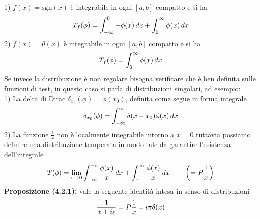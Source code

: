 \documentclass{article}
\begin{document}
1) $f(x) = \mathrm{sgn}(x)$ è integrabile in ogni $[a, b]$ compatto e si ha
\begin{gather}
    T_f(\phi) = \int_{-\infty}^0 -\phi(x) \, dx + \int_0^{\infty} \phi(x) \, dx \notag
\end{gather}
2) $f(x) = \theta(x)$ è integrabile in ogni $[a, b]$ compatto e si ha
\begin{gather}
    T_f(\phi) = \int_0^\infty \phi(x) \, dx \notag
\end{gather}
Se invece la distribuzione è non regolare bisogna verificare che è ben definita sulle funzioni di test, in questo caso si parla di distribuzioni singolari, ad esempio: \\
1) La delta di Dirac $\delta_{x_0}(\phi) = \phi(x_0)$, definita come segue in forma integrale
\begin{gather}
    \delta_{x_0}(\phi) = \int_{-\infty}^\infty \delta(x - x_0)\phi(x) \, dx \notag
\end{gather}
2) La funzione $\frac{1}{x}$ non è localmente integrabile intorno a $x = 0$ tuttavia possiamo definire una distribuzione temperata in modo tale da garantire l'esistenza dell'integrale
\begin{gather}
    T(\phi) = \lim_{\varepsilon \rightarrow 0} \int_{-\infty}^{-\varepsilon}\frac{\phi(x)}{x} \, dx + \int_{\varepsilon}^\infty \frac{\phi(x)}{x} \, dx \qquad \left( = P\frac{1}{x}\right) \notag
\end{gather}
\textbf{Proposizione (4.2.1):} vale la seguente identità intesa in senso di distribuzioni
\begin{gather}
    \frac{1}{x \pm i\varepsilon} = P\frac{1}{x} \mp i\pi\delta(x) \notag
\end{gather}
\end{document}
